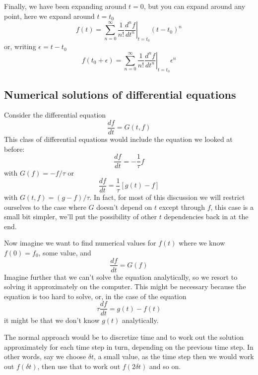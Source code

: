 \documentclass[12pt]{article}
\begin{document}
Finally, we have been expanding around $t=0$, but you can expand around any point, here we expand around $t=t_0$
\begin{equation}
f(t)=\sum_{n=0}^\infty\frac{1}{n!}\left.\frac{d^nf}{dt^n}\right|_{t=t_0}(t-t_0)^n
\end{equation}
or, writing $\epsilon=t-t_0$
\begin{equation}
f(t_0+\epsilon)=\sum_{n=0}^\infty\frac{1}{n!}\left.\frac{d^nf}{dt^n}\right|_{t=t_0}\epsilon^n
\end{equation}

\subsection*{Numerical solutions of differential equations}

Consider the differential equation
\begin{equation}
\frac{df}{dt}=G(t,f)
\end{equation}
This class of differential equations would include the equation we looked at before:
\begin{equation}
\frac{df}{dt}=-\frac{1}{\tau}f
\end{equation}
with $G(f)=-f/\tau$ or
\begin{equation}
\frac{df}{dt}=\frac{1}{\tau}[g(t)-f]
\end{equation}
with $G(t,f)=(g-f)/\tau$. In fact, for most of this discussion we will
restrict ourselves to the case where $G$ doesn't depend on $t$ except
through $f$, this case is a small bit simpler, we'll put the
possibility of other $t$ dependencies back in at the end.

Now imagine we want to find numerical values for $f(t)$ where we know
$f(0)=f_0$, some value, and
\begin{equation}
\frac{df}{dt}=G(f)
\end{equation}
Imagine further that we can't solve the equation analytically, so we
resort to solving it approximately on the computer. This might be
necessary because the equation is too hard to solve, or, in the case
of the equation
\begin{equation}
\tau\frac{df}{dt}=g(t)-f(t)
\end{equation}
it might be that we don't know $g(t)$ analytically.

The normal approach would be to discretize time and to work out the
solution approximately for each time step in turn, depending on the
previous time step. In other words, say we choose $\delta t$, a small
value, as the time step then we would work out $f(\delta t)$, then use
that to work out $f(2\delta t)$ and so on.
\end{document}
